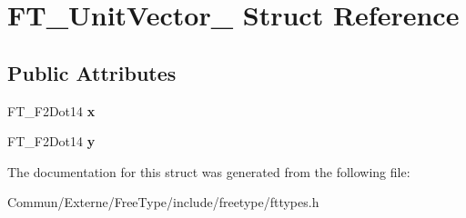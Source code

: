 \hypertarget{struct_f_t___unit_vector__}{}\section{F\+T\+\_\+\+Unit\+Vector\+\_\+ Struct Reference}
\label{struct_f_t___unit_vector__}
\subsection*{Public Attributes}
\begin{DoxyCompactItemize}
\item 
F\+T\+\_\+\+F2\+Dot14 {\bfseries x}\hypertarget{struct_f_t___unit_vector___a03c9f8ae35a5ad1bcac49995a9dac714}{}\label{struct_f_t___unit_vector___a03c9f8ae35a5ad1bcac49995a9dac714}

\item 
F\+T\+\_\+\+F2\+Dot14 {\bfseries y}\hypertarget{struct_f_t___unit_vector___a12eb9ad5c47614f5f2d3f9e401933d0e}{}\label{struct_f_t___unit_vector___a12eb9ad5c47614f5f2d3f9e401933d0e}

\end{DoxyCompactItemize}


The documentation for this struct was generated from the following file\+:\begin{DoxyCompactItemize}
\item 
Commun/\+Externe/\+Free\+Type/include/freetype/fttypes.\+h\end{DoxyCompactItemize}
